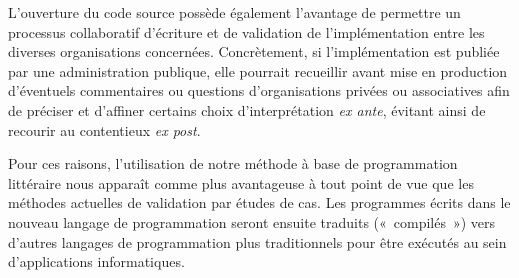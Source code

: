 L'ouverture du code source possède également l'avantage de permettre un processus collaboratif d'écriture et de validation de l'implémentation entre les diverses organisations concernées. Concrètement, si l'implémentation est publiée par une administration publique, elle pourrait recueillir avant mise en production d'éventuels commentaires ou questions d'organisations privées ou associatives afin de préciser et d'affiner certains choix d'interprétation \emph{ex ante}, évitant ainsi de recourir au contentieux \emph{ex post}.

Pour ces raisons, l'utilisation de notre méthode à base de programmation littéraire nous apparaît comme plus avantageuse à tout point de vue que les méthodes actuelles de validation par études de cas. Les programmes écrits dans le nouveau langage de programmation seront ensuite traduits (« compilés ») vers d'autres langages de programmation plus traditionnels pour être exécutés au sein d'applications informatiques.
